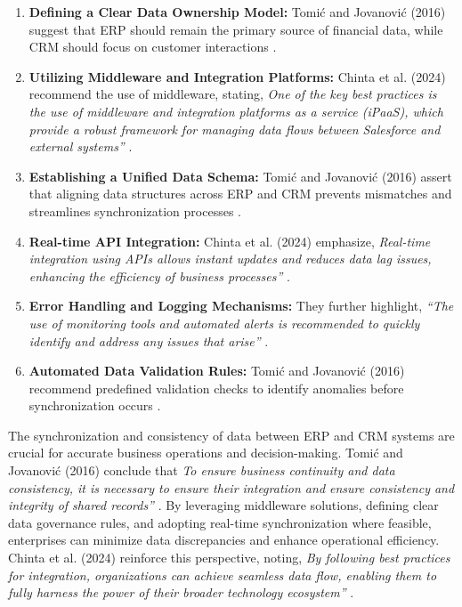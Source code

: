 \begin{enumerate}
\item \textbf{Defining a Clear Data Ownership Model:} Tomić and Jovanović (2016) suggest that ERP should remain the primary source of financial data, while CRM should focus on customer interactions \cite{tomic2016}.
\item \textbf{Utilizing Middleware and Integration Platforms:} Chinta et al. (2024) recommend the use of middleware, stating, \textit{One of the key best practices is the use of middleware and integration platforms as a service (iPaaS), which provide a robust framework for managing data flows between Salesforce and external systems''} \cite{chinta2024}.
    \item \textbf{Establishing a Unified Data Schema:} Tomić and Jovanović (2016) assert that aligning data structures across ERP and CRM prevents mismatches and streamlines synchronization processes \cite{tomic2016}.
    \item \textbf{Real-time API Integration:} Chinta et al. (2024) emphasize, \textit{Real-time integration using APIs allows instant updates and reduces data lag issues, enhancing the efficiency of business processes''} \cite{chinta2024}.
\item \textbf{Error Handling and Logging Mechanisms:} They further highlight, \textit{``The use of monitoring tools and automated alerts is recommended to quickly identify and address any issues that arise''} \cite{chinta2024}.
\item \textbf{Automated Data Validation Rules:} Tomić and Jovanović (2016) recommend predefined validation checks to identify anomalies before synchronization occurs \cite{tomic2016}.
\end{enumerate}


The synchronization and consistency of data between ERP and CRM systems are crucial for accurate business operations and decision-making. Tomić and Jovanović (2016) conclude that \textit{To ensure business continuity and data consistency, it is necessary to ensure their integration and ensure consistency and integrity of shared records''} \cite{tomic2016}. By leveraging middleware solutions, defining clear data governance rules, and adopting real-time synchronization where feasible, enterprises can minimize data discrepancies and enhance operational efficiency. Chinta et al. (2024) reinforce this perspective, noting, \textit{By following best practices for integration, organizations can achieve seamless data flow, enabling them to fully harness the power of their broader technology ecosystem''} \cite{chinta2024}.

